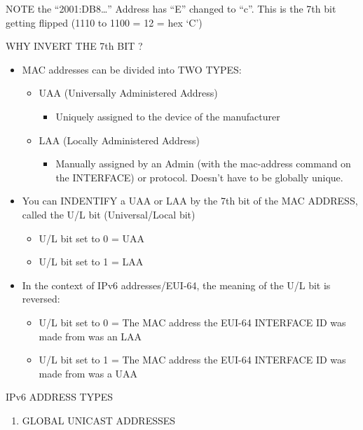 NOTE the ``2001:DB8\ldots'' Address has ``E'' changed to ``c''. This is
the 7th bit getting flipped (1110 to 1100 = 12 = hex `C')

WHY INVERT THE 7th BIT ?

\begin{itemize}
\tightlist
\item
  MAC addresses can be divided into TWO TYPES:

  \begin{itemize}
  \tightlist
  \item
    UAA (Universally Administered Address)

    \begin{itemize}
    \tightlist
    \item
      Uniquely assigned to the device of the manufacturer
    \end{itemize}
  \item
    LAA (Locally Administered Address)

    \begin{itemize}
    \tightlist
    \item
      Manually assigned by an Admin (with the mac-address command on the
      INTERFACE) or protocol. Doesn't have to be globally unique.
    \end{itemize}
  \end{itemize}
\item
  You can INDENTIFY a UAA or LAA by the 7th bit of the MAC ADDRESS,
  called the U/L bit (Universal/Local bit)

  \begin{itemize}
  \tightlist
  \item
    U/L bit set to 0 = UAA
  \item
    U/L bit set to 1 = LAA
  \end{itemize}
\item
  In the context of IPv6 addresses/EUI-64, the meaning of the U/L bit is
  reversed:

  \begin{itemize}
  \tightlist
  \item
    U/L bit set to 0 = The MAC address the EUI-64 INTERFACE ID was made
    from was an LAA
  \item
    U/L bit set to 1 = The MAC address the EUI-64 INTERFACE ID was made
    from was a UAA
  \end{itemize}
\end{itemize}

IPv6 ADDRESS TYPES

\begin{enumerate}
\def\labelenumi{\arabic{enumi})}
\tightlist
\item
  GLOBAL UNICAST ADDRESSES
\end{enumerate}

